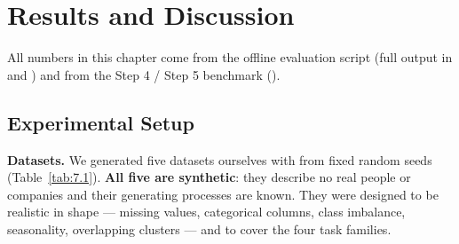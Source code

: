 \chapter{Results and Discussion}\label{ch:7}

All numbers in this chapter come from the offline evaluation script  (full output in  and ) and from the Step 4 / Step 5 benchmark ().

\FloatBarrier
\section{Experimental Setup}\label{sec:7.1}

\textbf{Datasets.} We generated five datasets ourselves with  from fixed random seeds (Table~\ref{tab:7.1}). \textbf{All five are synthetic}: they describe no real people or companies and their generating processes are known. They were designed to be realistic in shape --- missing values, categorical columns, class imbalance, seasonality, overlapping clusters --- and to cover the four task families.

